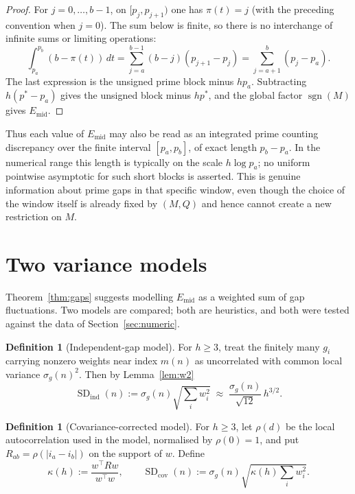 \documentclass[11pt]{amsart}
\numberwithin{equation}{section}
\theoremstyle{plain}
\theoremstyle{definition}
\newtheorem{definition}[theorem]{Definition}
\theoremstyle{remark}
\newcommand{\Mert}{M}
\newcommand{\Sq}{Q}
\begin{document}
\begin{proof}
For $j=0,\ldots,b-1$, on $[p_j,p_{j+1})$ one has $\pi(t)=j$ (with the
preceding convention when $j=0$). The sum below is finite, so there is no
interchange of infinite sums or limiting operations:
\begin{equation}
\label{eq:integral-summation}
\int_{p_a}^{p_b}(b-\pi(t))\,dt
 =\sum_{j=a}^{b-1}(b-j)(p_{j+1}-p_j)
 =\sum_{j=a+1}^{b}(p_j-p_a).
\end{equation}
The last expression is the unsigned prime block minus $h p_a$.
Subtracting $h(p^*-p_a)$ gives the unsigned block minus $hp^*$, and the global
factor $\operatorname{sgn}(\Mert)$ gives $E_{\mathrm{mid}}$.
\end{proof}

Thus each value of $E_{\mathrm{mid}}$ may also be read as an integrated prime
counting discrepancy over the finite interval $[p_a,p_b]$, of exact length
$p_b-p_a$. In the numerical range this length is typically on the scale
$h\log p_a$; no uniform pointwise asymptotic for such short blocks is asserted. This is genuine information about prime gaps in that specific
window, even though the choice of the window itself is already fixed by
$(\Mert,\Sq)$ and hence cannot create a new restriction on $\Mert$.

\section{Two variance models}
\label{sec:variance-models}

Theorem~\ref{thm:gaps} suggests modelling $E_{\mathrm{mid}}$ as a weighted sum
of gap fluctuations. Two models are compared; both are heuristics, and both were
tested against the data of Section~\ref{sec:numeric}.

\begin{definition}[Independent-gap model]
\label{def:independent-gap}
For $h\ge3$, treat the finitely many $g_i$ carrying nonzero weights near index
$m(n)$ as uncorrelated with common local variance
$\sigma_g(n)^{2}$. Then by Lemma~\ref{lem:w2}
\begin{equation}
\label{eq:sd-independent}
\operatorname{SD}_{\mathrm{ind}}(n):=\sigma_g(n)\sqrt{\textstyle\sum_i w_i^{2}}
\;\approx\;\frac{\sigma_g(n)}{\sqrt{12}}\,h^{3/2}.
\end{equation}
\end{definition}

\begin{definition}[Covariance-corrected model]
\label{def:covariance-gap}
For $h\ge3$, let $\rho(d)$ be the local autocorrelation used in the model,
normalised by $\rho(0)=1$, and put
$R_{ab}=\rho(|i_a-i_b|)$ on the support of $w$. Define
\begin{equation}
\label{eq:covariance-model}
\kappa(h):=\frac{w^{\!\top}Rw}{w^{\!\top}w},
\qquad
\operatorname{SD}_{\mathrm{cov}}(n):=\sigma_g(n)\sqrt{\kappa(h)\textstyle\sum_i w_i^{2}} .
\end{equation}
\end{definition}
\end{document}
